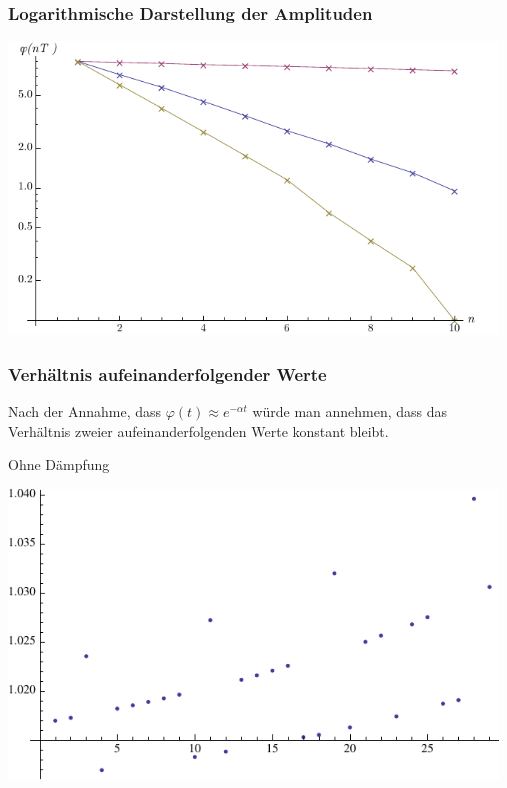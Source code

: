 \documentclass[12pt,a4paper]{article}
\begin{document}
\subsubsection*{Logarithmische Darstellung der Amplituden}
\begin{center}
\includegraphics[width=13cm]{plot1.pdf}
\end{center}

\subsubsection*{Verh\"altnis aufeinanderfolgender Werte}
Nach der Annahme, dass $\varphi(t) \approx e^{-\alpha t}$ w\"urde man annehmen, dass das Verh\"altnis zweier aufeinanderfolgenden Werte konstant bleibt.
\vspace{10pt}

Ohne D\"ampfung
\begin{center}
\includegraphics[width=13cm]{plot11.pdf}
\end{center}
\end{document}

